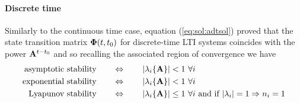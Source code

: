 	\paragraph{Discrete time} Similarly to the continuous time case, equation (\ref{eq:sol:adtsol}) proved that the state transition matrix $\mathbf{\Phi}(t,t_0)$ for discrete-time LTI systems coincides with the power $\mathbf{A}^{t-t_0}$ and so recalling the associated region of convergence we have
	\begin{equation}\begin{split}
			\textrm{asymptotic stability} \qquad & \Leftrightarrow \qquad |\lambda_i\{\mathbf{A}\}| < 1 \ \forall i \\
			\textrm{exponential stability} \qquad & \Leftrightarrow \qquad |\lambda_i\{\mathbf{A}\}| < 1 \ \forall i \\
			\textrm{Lyapunov stability} \qquad & \Leftrightarrow \qquad |\lambda_i\{\mathbf{A}\}| \leq  1 \ \forall i \textrm{ and if } |\lambda_i| = 1 \Rightarrow n_i = 1
	\end{split}\end{equation}
	
